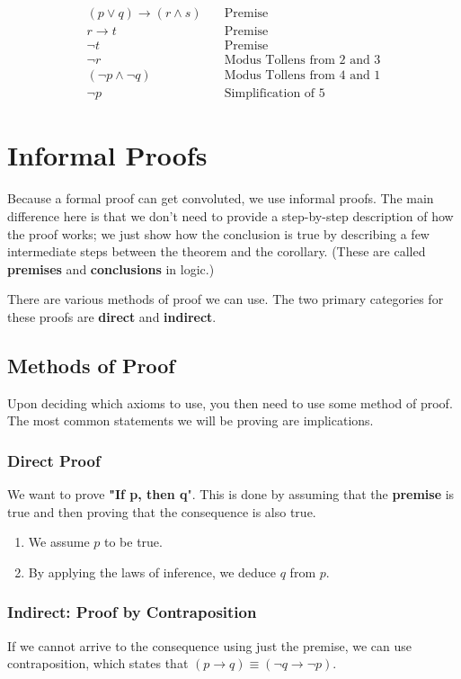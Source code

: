\documentclass[11pt]{article}
\begin{document}
\begin{align}
(p \lor q) \to (r \land s) & \quad \text{Premise} \\
r \to t & \quad \text{Premise} \\
\neg t & \quad \text{Premise} \\
\neg r & \quad \text{Modus Tollens from 2 and 3} \\
(\neg p \land \neg q) & \quad \text{Modus Tollens from 4 and 1} \\
\neg p & \quad \text{Simplification of 5}
\end{align}


\section{Informal Proofs}
\label{sec:orgec3447e}
Because a formal proof can get convoluted, we use informal proofs. The main difference here is that we don't need to provide a step-by-step description of how the proof works; we just show how the conclusion is true by describing a few intermediate steps between the theorem and the corollary. (These are called \textbf{premises} and \textbf{conclusions} in logic.)

There are various methods of proof we can use. The two primary categories for these proofs are \textbf{direct} and \textbf{indirect}.


\subsection{Methods of Proof}
\label{sec:orgd7f250d}
Upon deciding which axioms to use, you then need to use some method of proof. The most common statements we will be proving are implications.
\subsubsection{Direct Proof}
\label{sec:org744f52c}
We want to prove \textbf{"If p, then q}". This is done by assuming that the \textbf{premise} is true and then proving that the consequence is also true.

\begin{enumerate}
\item We assume \(p\) to be true.
\item By applying the laws of inference, we deduce \(q\) from \(p\).
\end{enumerate}
\subsubsection{Indirect: Proof by Contraposition}
\label{sec:orgb84564d}
If we cannot arrive to the consequence using just the premise, we can use contraposition, which states that \((p \to q) \equiv (\neg q \to \neg p)\).
\end{document}
